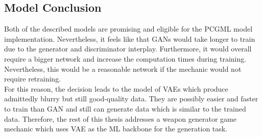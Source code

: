 \documentclass[MGS,Master,english]{twbook}%
\begin{document}
\subsection{Model Conclusion}
Both of the described models are promising and eligible for the PCGML model implementation. Nevertheless, it feels like that \acp{GAN} would take longer to train due to the generator and discriminator interplay. Furthermore, it would overall require a bigger network and increase the computation times during training. Nevertheless, this would be a reasonable network if the mechanic would not require retraining.\\
For this reason, the decision leads to the model of \acp{VAE} which produce admittedly blurry but still good-quality data. They are possibly easier and faster to train than \ac{GAN} and still can generate data which is similar to the trained data. Therefore, the rest of this thesis addresses a weapon generator game mechanic which uses \ac{VAE} as the ML backbone for the generation task.
\end{document}
